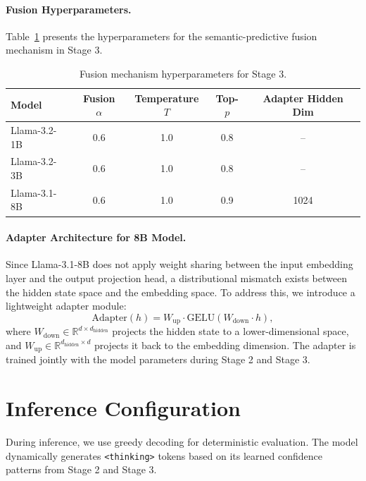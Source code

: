 \documentclass{article}
\theoremstyle{plain}
\theoremstyle{definition}
\theoremstyle{remark}
\begin{document}
\paragraph{Fusion Hyperparameters.}
Table~\ref{tab:fusion_config} presents the hyperparameters for the semantic-predictive fusion mechanism in Stage 3.

\begin{table}[h]
\centering
\begin{tabular}{lcccc}
\toprule
\textbf{Model} & \textbf{Fusion $\alpha$} & \textbf{Temperature $T$} & \textbf{Top-$p$} & \textbf{Adapter Hidden Dim} \\
\midrule
Llama-3.2-1B & 0.6 & 1.0 & 0.8 & -- \\
Llama-3.2-3B & 0.6 & 1.0 & 0.8 & -- \\
Llama-3.1-8B & 0.6 & 1.0 & 0.9 & 1024 \\
\bottomrule
\end{tabular}
\caption{Fusion mechanism hyperparameters for Stage 3.}
\label{tab:fusion_config}
\end{table}

\paragraph{Adapter Architecture for 8B Model.}
Since Llama-3.1-8B does not apply weight sharing between the input embedding layer and the output projection head, a distributional mismatch exists between the hidden state space and the embedding space. To address this, we introduce a lightweight adapter module:
\begin{equation}
    \text{Adapter}(h) = W_{\text{up}} \cdot \text{GELU}(W_{\text{down}} \cdot h),
\end{equation}
where $W_{\text{down}} \in \mathbb{R}^{d \times d_{\text{hidden}}}$ projects the hidden state to a lower-dimensional space, and $W_{\text{up}} \in \mathbb{R}^{d_{\text{hidden}} \times d}$ projects it back to the embedding dimension. The adapter is trained jointly with the model parameters during Stage 2 and Stage 3.

\section{Inference Configuration}
\label{app:inference}

During inference, we use greedy decoding for deterministic evaluation. The model dynamically generates \texttt{<thinking>} tokens based on its learned confidence patterns from Stage 2 and Stage 3. 
\end{document}
